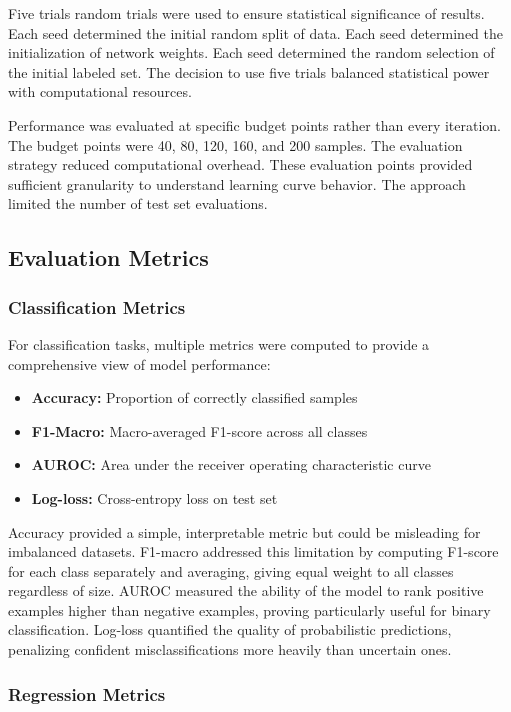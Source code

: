 \documentclass[conference]{IEEEtran}
\begin{document}
Five trials random trials were used to ensure statistical significance of results. Each seed determined the initial random split of data. Each seed determined the initialization of network weights. Each seed determined the random selection of the initial labeled set. The decision to use five trials balanced statistical power with computational resources.

Performance was evaluated at specific budget points rather than every iteration. The budget points were 40, 80, 120, 160, and 200 samples. The evaluation strategy reduced computational overhead. These evaluation points provided sufficient granularity to understand learning curve behavior. The approach limited the number of test set evaluations.

\subsection{Evaluation Metrics}

\subsubsection{Classification Metrics}

For classification tasks, multiple metrics were computed to provide a comprehensive view of model performance:

\begin{itemize}
\item \textbf{Accuracy:} Proportion of correctly classified samples
\item \textbf{F1-Macro:} Macro-averaged F1-score across all classes
\item \textbf{AUROC:} Area under the receiver operating characteristic curve
\item \textbf{Log-loss:} Cross-entropy loss on test set
\end{itemize}

Accuracy provided a simple, interpretable metric but could be misleading for imbalanced datasets. F1-macro addressed this limitation by computing F1-score for each class separately and averaging, giving equal weight to all classes regardless of size. AUROC measured the ability of the model to rank positive examples higher than negative examples, proving particularly useful for binary classification. Log-loss quantified the quality of probabilistic predictions, penalizing confident misclassifications more heavily than uncertain ones.

\subsubsection{Regression Metrics}
\end{document}
